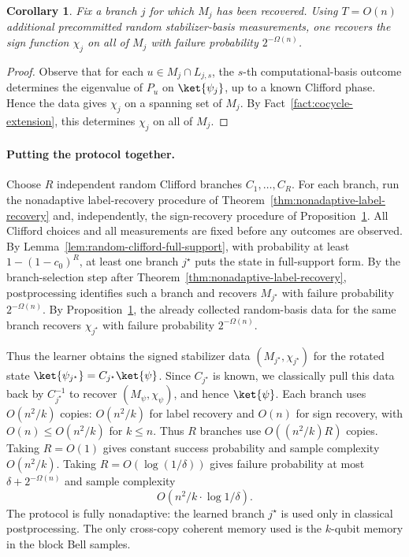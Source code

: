 \documentclass[11pt]{article}
\newtheorem{corollary}[theorem]{Corollary}
\begin{document}
\begin{corollary}
\label{prop:nonadaptive-sign-recovery}
Fix a branch $j$ for which $M_j$ has been recovered.  Using $T=O(n)$
additional precommitted random stabilizer-basis measurements, one recovers the
sign function $\chi_j$ on all of $M_j$ with failure probability
$2^{-\Omega(n)}$.
\end{corollary}

\begin{proof}
Observe that for each $u\in M_j\cap L_{j,s}$, the $s$-th computational-basis outcome
determines the eigenvalue of $P_u$ on $\ket{\psi_j}$, up to a known
Clifford phase.  Hence the data gives $\chi_j$ on a spanning set of
$M_j$.  By Fact~\ref{fact:cocycle-extension}, this determines $\chi_j$ on
all of $M_j$.
\end{proof}
\paragraph{Putting the protocol together.}
Choose $R$ independent random Clifford branches $C_1,\ldots,C_R$.  For each
branch, run the nonadaptive label-recovery procedure of
Theorem~\ref{thm:nonadaptive-label-recovery} and, independently, the sign-recovery
procedure of Proposition~\ref{prop:nonadaptive-sign-recovery}.  All Clifford
choices and all measurements are fixed before any outcomes are observed. By Lemma~\ref{lem:random-clifford-full-support}, with probability at least
$1-(1-c_0)^R$, at least one branch $j^\star$ puts the state in full-support
form.  By the branch-selection step after
Theorem~\ref{thm:nonadaptive-label-recovery}, postprocessing identifies such a
branch and recovers $M_{j^\star}$ with failure probability $2^{-\Omega(n)}$.
By Proposition~\ref{prop:nonadaptive-sign-recovery}, the already collected
random-basis data for the same branch recovers $\chi_{j^\star}$ with failure
probability $2^{-\Omega(n)}$.

Thus the learner obtains the signed stabilizer data
$(M_{j^\star},\chi_{j^\star})$ for the rotated state
$\ket{\psi_{j^\star}}=C_{j^\star}\ket{\psi}$.  Since $C_{j^\star}$ is known,
we classically pull this data back by $C_{j^\star}^{-1}$ to recover
$(M_\psi,\chi_\psi)$, and hence $\ket{\psi}$. Each branch uses $O(n^2/k)$ copies: $O(n^2/k)$ for label recovery and $O(n)$
for sign recovery, with $O(n)\le O(n^2/k)$ for $k\le n$.  Thus $R$ branches use
$O((n^2/k)R)$ copies.  Taking $R=O(1)$ gives constant success probability and
sample complexity $O(n^2/k)$.  Taking $R=O(\log(1/\delta))$ gives failure
probability at most $\delta+2^{-\Omega(n)}$ and sample complexity
$$
    O\!\left(n^2/k\cdot \log1/\delta\right).
$$
The protocol is fully nonadaptive: the learned branch $j^\star$ is used only in
classical postprocessing.  The only cross-copy coherent memory used is the
$k$-qubit memory in the block Bell samples.
\end{document}
